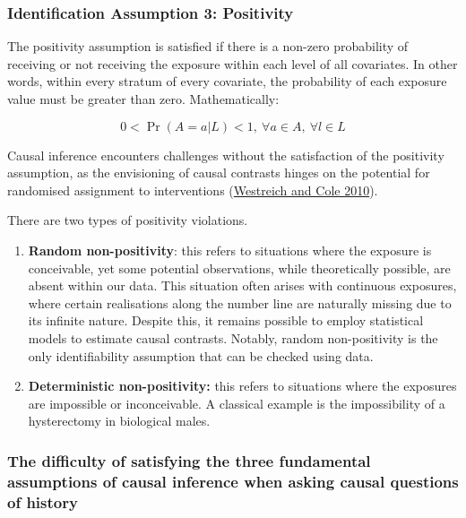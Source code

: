 \documentclass[
  singlecolumn]{article}
\begin{document}
\hypertarget{identification-assumption-3-positivity}{%
\subsubsection{Identification Assumption 3:
Positivity}\label{identification-assumption-3-positivity}}

The positivity assumption is satisfied if there is a non-zero
probability of receiving or not receiving the exposure within each level
of all covariates. In other words, within every stratum of every
covariate, the probability of each exposure value must be greater than
zero. Mathematically:

\[
0 < \Pr(A=a|L)<1, ~ \forall a \in A, ~ \forall l \in L
\]

Causal inference encounters challenges without the satisfaction of the
positivity assumption, as the envisioning of causal contrasts hinges on
the potential for randomised assignment to interventions
(\protect\hyperlink{ref-westreich2010}{Westreich and Cole 2010}).

There are two types of positivity violations.

\begin{enumerate}
\def\labelenumi{\arabic{enumi}.}
\item
  \textbf{Random non-positivity}: this refers to situations where the
  exposure is conceivable, yet some potential observations, while
  theoretically possible, are absent within our data. This situation
  often arises with continuous exposures, where certain realisations
  along the number line are naturally missing due to its infinite
  nature. Despite this, it remains possible to employ statistical models
  to estimate causal contrasts. Notably, random non-positivity is the
  only identifiability assumption that can be checked using data.
\item
  \textbf{Deterministic non-positivity:} this refers to situations where
  the exposures are impossible or inconceivable. A classical example is
  the impossibility of a hysterectomy in biological males.
\end{enumerate}

\hypertarget{the-difficulty-of-satisfying-the-three-fundamental-assumptions-of-causal-inference-when-asking-causal-questions-of-history}{%
\subsubsection{The difficulty of satisfying the three fundamental
assumptions of causal inference when asking causal questions of
history}\label{the-difficulty-of-satisfying-the-three-fundamental-assumptions-of-causal-inference-when-asking-causal-questions-of-history}}
\end{document}
